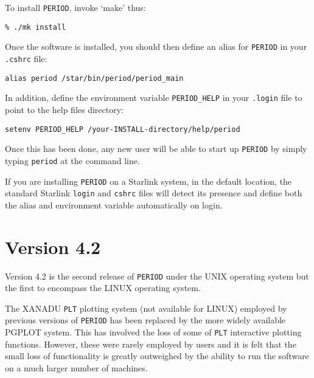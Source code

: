To install {\tt PERIOD}, invoke `make' thus:

\begin{myquote}
\begin{verbatim}
% ./mk install
\end{verbatim}
\end{myquote}

Once the software is installed, you should then define an alias for
{\tt PERIOD} in your {\tt .cshrc} file:

\begin{myquote}
\begin{verbatim}
alias period /star/bin/period/period_main
\end{verbatim}
\end{myquote}

In addition, define the environment variable {\tt PERIOD\_HELP} in your
{\tt .login} file to point to the help files directory:

\begin{myquote}
\begin{verbatim}
setenv PERIOD_HELP /your-INSTALL-directory/help/period
\end{verbatim}
\end{myquote}

Once this has been done, any new user will be able to start up {\tt PERIOD}
by simply typing {\tt period} at the command line.

If you are installing {\tt PERIOD} on a Starlink system, in the default
location, the standard Starlink {\tt login} and {\tt cshrc} files will
detect its presence and define both the alias and environment variable
automatically on login.

\section{Version 4.2}

Version 4.2 is the second release of {\tt PERIOD} under the UNIX operating
system but the first to encompass the LINUX operating system.

The XANADU {\tt PLT} plotting system (not available for LINUX) employed by
previous versions of {\tt PERIOD} has been replaced by the more widely
available PGPLOT system. This has involved the loss of some of {\tt PLT}
interactive plotting functions. However, these were rarely employed by users
and it is felt that the small loss of functionality is greatly outweighed by
the ability to run the software on a much larger number of machines.

